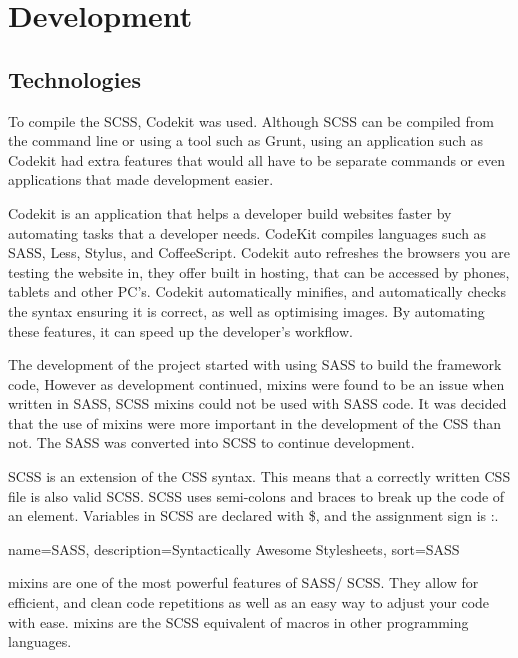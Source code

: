 \chapter*{Development}
\section*{Technologies}

To compile the \gls{SCSS}, Codekit \citep{CODEKIT17} was used. Although \gls{SCSS} can be compiled from the command line or using a tool such as Grunt, using an application such as Codekit had extra features that would all have to be separate commands or even applications that made development easier. 

Codekit is an application that helps a developer build websites faster by automating tasks that a developer needs. CodeKit compiles languages such as SASS, Less, Stylus, and CoffeeScript. Codekit auto refreshes the browsers you are testing the website in, they offer built in hosting, that can be accessed by phones, tablets and other PC's. Codekit automatically minifies, and automatically checks the syntax ensuring it is correct, as well as optimising images. By automating these features, it can speed up the developer's workflow. 

The development of the project started with using \gls{SASS} to build the framework code, However as development continued, \gls{mixins} were found to be an issue when written in \gls{SASS}, \gls{SCSS} \gls{mixins} could not be used with \gls{SASS} code. It was decided that the use of \gls{mixins} were more important in the development of the \gls{CSS} than not. The \gls{SASS} was converted into \gls{SCSS} to continue development. 

\gls{SCSS} is an extension of the \gls{CSS} syntax. This means that a correctly written \gls{CSS} file is also valid \gls{SCSS}. \gls{SCSS} uses semi-colons and braces to break up the code of an element. Variables in \gls{SCSS} are declared with \$, and the assignment sign is :. 


%
{
  name={SASS},
  description={Syntactically Awesome Stylesheets},
  sort=SASS
}
%

\gls{mixins} are one of the most powerful features of \gls{SASS}/ \gls{SCSS}. They allow for efficient, and clean code repetitions as well as an easy way to adjust your code with ease. \gls{mixins} are the \gls{SCSS} equivalent of macros in other programming languages.

